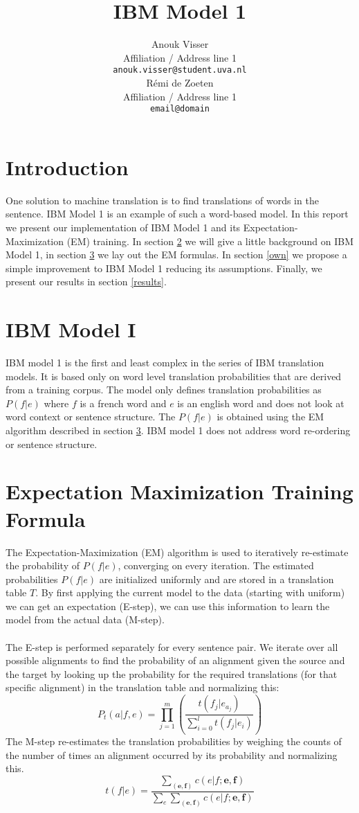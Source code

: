 \documentclass[11pt]{article}
\title{IBM Model 1}
\author{Anouk Visser \\
  Affiliation / Address line 1 \\
  {\tt anouk.visser@student.uva.nl} \\\And
  R\'emi de Zoeten \\
  Affiliation / Address line 1 \\
  {\tt email@domain} \\}
\date{}
\begin{document}
\maketitle

\section{Introduction}
One solution to machine translation is to find translations of words in the sentence. IBM Model 1 is an example of such a word-based model. In this report we present our implementation of IBM Model 1 and its Expectation-Maximization (EM) training. In section \ref{IBM} we will give a little background on IBM Model 1, in section \ref{em} we lay out the EM formulas. In section \ref{own} we propose a simple improvement to IBM Model 1 reducing its assumptions. Finally, we present our results in section \ref{results}.


\section{IBM Model I}
\label{IBM}
IBM model 1 is the first and least complex in the series of IBM translation models. It is based only on word level translation probabilities that are derived from a training corpus. The model only defines translation probabilities as $P(f|e)$ where $f$ is a french word and $e$ is an english word and does not look at word context or sentence structure. The $P(f|e)$ is obtained using the EM algorithm described in section \ref{em}. IBM model 1 does not address word re-ordering or sentence structure.

\section{Expectation Maximization Training Formula}
\label{em}
The Expectation-Maximization (EM) algorithm is used to iteratively re-estimate the probability of $P(f|e)$, converging on every iteration. The estimated probabilities $P(f|e)$ are initialized uniformly and are stored in a translation table $T$. By first applying the current model to the data (starting with uniform) we can get an expectation (E-step), we can use this information to learn the model from the actual data (M-step).\\\\
The E-step is performed separately for every sentence pair. We iterate over all possible alignments to find the probability of an alignment given the source and the target by looking up the probability for the required translations (for that specific alignment) in the translation table and normalizing this: 
$$P_t(a|f, e) = \prod\limits_{j=1}^{m} (\frac{t(f_j|e_{a_{j}})}{\sum\limits_{i=0}^{l}t(f_j|e_i)})$$
The M-step re-estimates the translation probabilities by weighing the counts of the number of times an alignment occurred by its probability and normalizing this. 
$$t(f|e) = \frac{\sum\limits_{(\textbf{e}, \textbf{f})} c(e|f; \textbf{e}, \textbf{f})}{\sum\limits_{e}\sum\limits_{(\textbf{e}, \textbf{f})} c(e|f; \textbf{e}, \textbf{f})}$$
\end{document}
